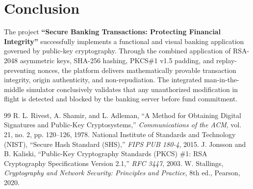 \documentclass[11pt,a4paper]{article}
\begin{document}
\section{Conclusion}
The project \textbf{``Secure Banking Transactions: Protecting Financial Integrity''} successfully implements a functional and visual banking application governed by public-key cryptography. Through the combined application of RSA-2048 asymmetric keys, SHA-256 hashing, PKCS\#1 v1.5 padding, and replay-preventing nonces, the platform delivers mathematically provable transaction integrity, origin authenticity, and non-repudiation. The integrated man-in-the-middle simulator conclusively validates that any unauthorized modification in flight is detected and blocked by the banking server before fund commitment.

\begin{thebibliography}{99}
 R. L. Rivest, A. Shamir, and L. Adleman, ``A Method for Obtaining Digital Signatures and Public-Key Cryptosystems,'' \textit{Communications of the ACM}, vol. 21, no. 2, pp. 120--126, 1978.
 National Institute of Standards and Technology (NIST), ``Secure Hash Standard (SHS),'' \textit{FIPS PUB 180-4}, 2015.
 J. Jonsson and B. Kaliski, ``Public-Key Cryptography Standards (PKCS) \#1: RSA Cryptography Specifications Version 2.1,'' \textit{RFC 3447}, 2003.
 W. Stallings, \textit{Cryptography and Network Security: Principles and Practice}, 8th ed., Pearson, 2020.
\end{thebibliography}
\end{document}
